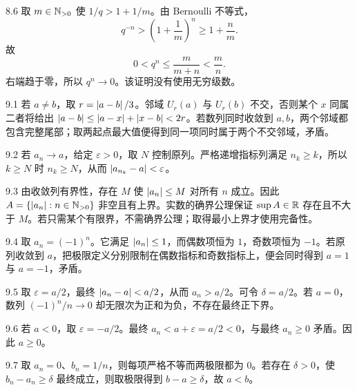 \begin{solution}{8.6}
取 \(m\in\mathbb{N}_{>0}\) 使 \(1/q>1+1/m\)。由 Bernoulli 不等式，
\[
 q^{-n}>\left(1+\frac1m\right)^n\ge1+\frac nm.
\]
故
\[
 0<q^n\le\frac{m}{m+n}<\frac mn.
\]
右端趋于零，所以 \(q^n\to0\)。该证明没有使用无穷级数。
\end{solution}

\begin{solution}{9.1}
若 \(a\ne b\)，取 \(r=\left|a-b\right|/3\)。邻域 \(U_r(a)\) 与 \(U_r(b)\) 不交，否则某个 \(x\) 同属二者将给出
\(\left|a-b\right|\le\left|a-x\right|+\left|x-b\right|<2r\)。若数列同时收敛到 \(a,b\)，两个邻域都包含完整尾部；取两起点最大值便得到同一项同时属于两个不交邻域，矛盾。
\end{solution}

\begin{solution}{9.2}
若 \(a_n\to a\)，给定 \(\varepsilon>0\)，取 \(N\) 控制原列。严格递增指标列满足 \(n_k\ge k\)，所以 \(k\ge N\) 时 \(n_k\ge N\)，从而 \(\left|a_{n_k}-a\right|<\varepsilon\)。
\end{solution}

\begin{solution}{9.3}
由收敛列有界性，存在 \(M\) 使 \(\left|a_n\right|\le M\) 对所有 \(n\) 成立。因此
\(A=\{\left|a_n\right|:n\in\mathbb{N}_{>0}\}\) 非空且有上界。实数的确界公理保证 \(\sup A\in\mathbb{R}\) 存在且不大于 \(M\)。若只需某个有限界，不需确界公理；取得最小上界才使用完备性。
\end{solution}

\begin{solution}{9.4}
取 \(a_n=(-1)^n\)。它满足 \(\left|a_n\right|\le1\)，而偶数项恒为 \(1\)，奇数项恒为 \(-1\)。若原列收敛到 \(a\)，把极限定义分别限制在偶数指标和奇数指标上，便会同时得到 \(a=1\) 与 \(a=-1\)，矛盾。
\end{solution}

\begin{solution}{9.5}
取 \(\varepsilon=a/2\)，最终 \(\left|a_n-a\right|<a/2\)，从而 \(a_n>a/2\)。可令 \(\delta=a/2\)。若 \(a=0\)，数列 \((-1)^n/n\to0\) 却无限次为正和为负，不存在最终正下界。
\end{solution}

\begin{solution}{9.6}
若 \(a<0\)，取 \(\varepsilon=-a/2\)。最终 \(a_n<a+\varepsilon=a/2<0\)，与最终 \(a_n\ge0\) 矛盾。因此 \(a\ge0\)。
\end{solution}

\begin{solution}{9.7}
取 \(a_n=0\)、\(b_n=1/n\)，则每项严格不等而两极限都为 \(0\)。若存在 \(\delta>0\)，使
\(b_n-a_n\ge\delta\) 最终成立，则取极限得到 \(b-a\ge\delta\)，故 \(a<b\)。
\end{solution}

